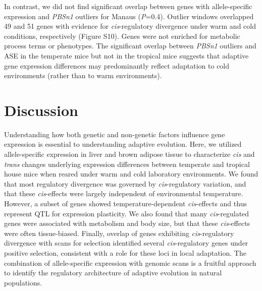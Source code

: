 \documentclass[9pt,twocolumn,twoside,lineno]{pnas-new}
\begin{document}
In contrast, we did not find significant overlap between genes with
allele-specific expression and \emph{PBSn1} outliers for Manaus
(\emph{P}=0.4). Outlier windows overlapped 49 and 51 genes with evidence
for \emph{cis}-regulatory divergence under warm and cold conditions,
respectively (Figure S10). Genes were not enriched for metabolic process
terms or phenotypes. The significant overlap between \emph{PBSn1}
outliers and ASE in the temperate mice but not in the tropical mice
suggests that adaptive gene expression differences may predominantly
reflect adaptation to cold environments (rather than to warm
environments).

\hypertarget{discussion}{%
\section*{Discussion}\label{discussion}}

Understanding how both genetic and non-genetic factors influence gene
expression is essential to understanding adaptive evolution. Here, we
utilized allele-specific expression in liver and brown adipose tissue to
characterize \emph{cis} and \emph{trans} changes underlying expression
differences between temperate and tropical house mice when reared under
warm and cold laboratory environments. We found that most regulatory
divergence was governed by \emph{cis}-regulatory variation, and that
these \emph{cis}-effects were largely independent of environmental
temperature. However, a subset of genes showed temperature-dependent
\emph{cis}-effects and thus represent QTL for expression plasticity. We
also found that many \emph{cis}-regulated genes were associated with
metabolism and body size, but that these \emph{cis}-effects were often
tissue-biased. Finally, overlap of genes exhibiting
\emph{cis}-regulatory divergence with scans for selection identified
several \emph{cis}-regulatory genes under positive selection, consistent
with a role for these loci in local adaptation. The combination of
allele-specific expression with genomic scans is a fruitful approach to
identify the regulatory architecture of adaptive evolution in natural
populations.
\end{document}
